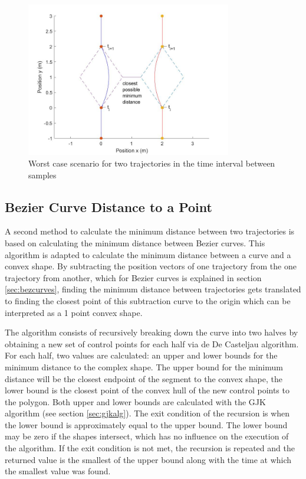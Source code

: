 \begin{figure}
\centering
\includegraphics[width=0.8\textwidth]{Images/theworstcasescenario.jpg}
\caption{Worst case scenario for two trajectories in the time interval between samples}
\label{fig:theworstcasescenario}
\end{figure}


\subsection{Bezier Curve Distance to a Point}
\label{sec:bezcurvetopoint}

\par A second method to calculate the minimum distance between two trajectories is based on calculating the minimum distance between Bezier curves. \cite{chang2011computation} This algorithm is adapted to calculate the minimum distance between a curve and a convex shape. By subtracting the position vectors of one trajectory from the one trajectory from another, which for Bezier curves is explained in section \ref{sec:bezcurves}, finding the minimum distance between trajectories gets translated to finding the closest point of this subtraction curve to the origin which can be interpreted as a 1 point convex shape.
\par The algorithm consists of recursively breaking down the curve into two halves by obtaining a new set of control points for each half via de De Casteljau algorithm. For each half, two values are calculated: an upper and lower bounds for the minimum distance to the complex shape. The upper bound for the minimum distance will be the closest endpoint of the segment to the convex shape, the lower bound is the closest point of the convex hull of the new control points to the polygon. Both upper and lower bounds are calculated with the \acs{GJK} algorithm (see section \ref{sec:gjkalg}). The exit condition of the recursion is when the lower bound is approximately equal to the upper bound. The lower bound may be zero if the shapes intersect, which has no influence on the execution of the algorithm. If the exit condition is not met, the recursion is repeated and the returned value is the smallest of the upper bound along with the time at which the smallest value was found.

